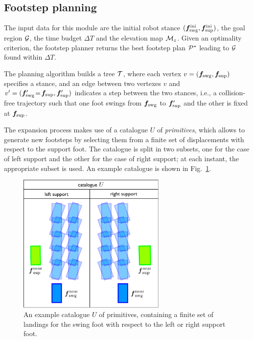 \subsection{Footstep planning}
\label{sec:WoS:offlineCase:FootstepPlanner}

The input data for this module are the initial robot stance
$({\bm{f}}_{\rm swg}^{\rm ini}, {\bm{f}}_{\rm sup}^{\rm ini})$, the goal region
$\cal G$, the time budget $\Delta T$ and the elevation map ${\cal M}_z$.
Given an optimality criterion, the footstep planner returns the best footstep
plan ${\cal P}^*$ leading to $\cal G$ found within $\Delta T$. 

The planning algorithm builds a tree $\cal T$, where each vertex
$v = ({\bm{f}}_{\rm swg}, {\bm{f}}_{\rm sup})$ specifies a stance, and an edge between
two vertexes $v$ and $v' = ({\bm{f}}'_{\rm swg}\!=\!{\bm{f}}_{\rm sup}, {\bm{f}}'_{\rm sup})$
indicates a step between the two stances, i.e., a collision-free trajectory such
that one foot swings from ${\bm{f}}_{\rm swg}$ to ${\bm{f}}'_{\rm sup}$ and the other
is fixed at ${\bm{f}}_{\rm sup}$.

The expansion process makes use of a catalogue $U$ of {\em primitives}, which
allows to generate new footsteps by selecting them from a finite set of
displacements with respect to the support foot. The catalogue is split in two
subsets, one for the case of left support  and the other for the case of right
support; at each instant, the appropriate subset is used. An example catalogue
is shown in Fig.~\ref{fig:WoS:Primitives}.

\begin{figure}
    \centering
    \includegraphics[width=0.65\textwidth]{figures/Primitives.pdf}
    \caption{An example catalogue $U$ of primitives, containing a finite set of
    landings for the swing foot with respect to the left or right support foot.}
    \label{fig:WoS:Primitives}
\end{figure}

